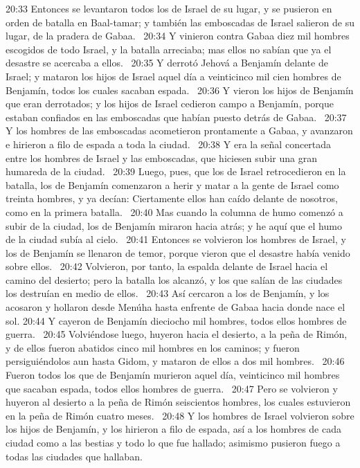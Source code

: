 20:33 Entonces se levantaron todos los de Israel de su lugar, y se pusieron en orden de batalla en Baal-tamar; y también las emboscadas de Israel salieron de su lugar, de la pradera de Gabaa.  
20:34 Y vinieron contra Gabaa diez mil hombres escogidos de todo Israel, y la batalla arreciaba; mas ellos no sabían que ya el desastre se acercaba a ellos.  
20:35 Y derrotó Jehová a Benjamín delante de Israel; y mataron los hijos de Israel aquel día a veinticinco mil cien hombres de Benjamín, todos los cuales sacaban espada.  
20:36 Y vieron los hijos de Benjamín que eran derrotados; y los hijos de Israel cedieron campo a Benjamín, porque estaban confiados en las emboscadas que habían puesto detrás de Gabaa.  
20:37 Y los hombres de las emboscadas acometieron prontamente a Gabaa, y avanzaron e hirieron a filo de espada a toda la ciudad.  
20:38 Y era la señal concertada entre los hombres de Israel y las emboscadas, que hiciesen subir una gran humareda de la ciudad.  
20:39 Luego, pues, que los de Israel retrocedieron en la batalla, los de Benjamín comenzaron a herir y matar a la gente de Israel como treinta hombres, y ya decían: Ciertamente ellos han caído delante de nosotros, como en la primera batalla.  
20:40 Mas cuando la columna de humo comenzó a subir de la ciudad, los de Benjamín miraron hacia atrás; y he aquí que el humo de la ciudad subía al cielo.  
20:41 Entonces se volvieron los hombres de Israel, y los de Benjamín se llenaron de temor, porque vieron que el desastre había venido sobre ellos.  
20:42 Volvieron, por tanto, la espalda delante de Israel hacia el camino del desierto; pero la batalla los alcanzó, y los que salían de las ciudades los destruían en medio de ellos.  
20:43 Así cercaron a los de Benjamín, y los acosaron y hollaron desde Menúha hasta enfrente de Gabaa hacia donde nace el sol. 
20:44 Y cayeron de Benjamín dieciocho mil hombres, todos ellos hombres de guerra.  
20:45 Volviéndose luego, huyeron hacia el desierto, a la peña de Rimón, y de ellos fueron abatidos cinco mil hombres en los caminos; y fueron persiguiéndolos aun hasta Gidom, y mataron de ellos a dos mil hombres.  
20:46 Fueron todos los que de Benjamín murieron aquel día, veinticinco mil hombres que sacaban espada, todos ellos hombres de guerra.  
20:47 Pero se volvieron y huyeron al desierto a la peña de Rimón seiscientos hombres, los cuales estuvieron en la peña de Rimón cuatro meses.  
20:48 Y los hombres de Israel volvieron sobre los hijos de Benjamín, y los hirieron a filo de espada, así a los hombres de cada ciudad como a las bestias y todo lo que fue hallado; asimismo pusieron fuego a todas las ciudades que hallaban.  
